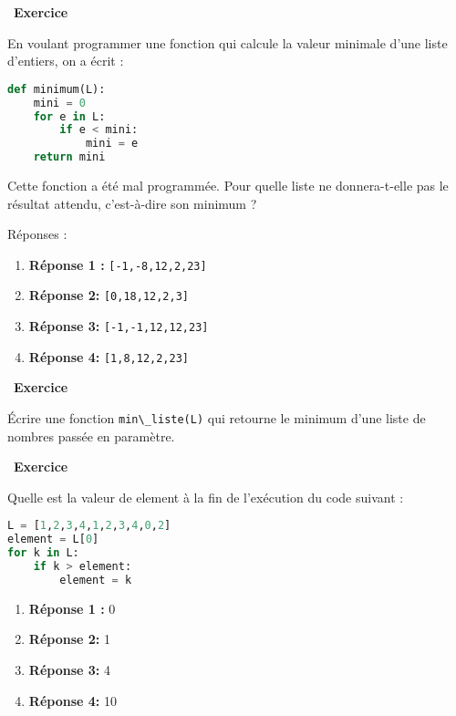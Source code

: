 \documentclass[
  11pt,
]{article}
\newcommand{\passthrough}[1]{#1}
\providecommand{\tightlist}{%
  \setlength{\itemsep}{0pt}\setlength{\parskip}{0pt}}
\newcounter{exo}
\newenvironment{exercice}[1]
{\par \medskip   \addtocounter{exo}{1} \noindent  
\begin{bclogo}[arrondi =0.1,   noborder = true, logo=\bccrayon, marge=4]{~\textbf{Exercice} \textbf{\theexo} {\itshape #1} }  \par}
{
\end{bclogo}
 \par \bigskip }
\newcounter{def}
\newcounter{prog}
\begin{document}
\begin{exercice}{}

En voulant programmer une fonction qui calcule la valeur minimale d'une
liste d'entiers, on a écrit :

\begin{lstlisting}[language=Python]
def minimum(L):
    mini = 0
    for e in L:
        if e < mini:
            mini = e
    return mini
\end{lstlisting}

Cette fonction a été mal programmée. Pour quelle liste ne donnera-t-elle
pas le résultat attendu, c'est-à-dire son minimum ?

Réponses :

\begin{enumerate}
\def\labelenumi{\arabic{enumi}.}
\tightlist
\item
  \textbf{Réponse 1 :} \passthrough{\lstinline![-1,-8,12,2,23]!}
\item
  \textbf{Réponse 2:} \passthrough{\lstinline![0,18,12,2,3]!}
\item
  \textbf{Réponse 3:} \passthrough{\lstinline![-1,-1,12,12,23]!}
\item
  \textbf{Réponse 4:} \passthrough{\lstinline![1,8,12,2,23]!}
\end{enumerate}

\end{exercice}

\begin{exercice}{}

Écrire une fonction \passthrough{\lstinline!min\_liste(L)!} qui retourne
le minimum d'une liste de nombres passée en paramètre.

\end{exercice}

\begin{exercice}{}

Quelle est la valeur de element à la fin de l'exécution du code suivant
:

\begin{lstlisting}[language=Python]
L = [1,2,3,4,1,2,3,4,0,2]
element = L[0]
for k in L:
    if k > element:
        element = k
\end{lstlisting}

\begin{enumerate}
\def\labelenumi{\arabic{enumi}.}
\tightlist
\item
  \textbf{Réponse 1 :} 0
\item
  \textbf{Réponse 2:} 1
\item
  \textbf{Réponse 3:} 4
\item
  \textbf{Réponse 4:} 10
\end{enumerate}

\end{exercice}
\end{document}
